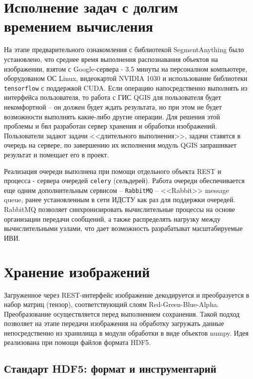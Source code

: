 \documentclass[732,14pt,final]{studrep}
\begin{document}
\section{Исполнение задач с долгим времением вычисления}

На этапе предварительного ознакомления с библиотекой SegmentAnything было установлено, что среднее время выполнения распознавания объектов на изображении, взятом с Google-сервера - 3.5 минуты на персоналном компьютере, оборудованом ОС Linux, видеокартой NVIDIA 1030 и использование библиотеки \verb|tensorflow| с поддержкой CUDA. Если операцию напосредственно выполнять из интерфейса пользователя, то работа с ГИС QGIS для пользователя будет некомфортной -- он должен будет ждать результата, но при этом не будет возможности выполнять какие-либо другие операции. Для решения этой проблемы и бвл разработан сервер хранения и обработки изображений. Пользователи задают задачи <<длительного выполнения>>, задачи ставятся в очередь на сервере, по завершению их исполнения модуль QGIS запрашивает результат и помещает его в проект.

Реализация очереди выполнена при помощи отдельного объекта REST и процесса - сервера очередей \verb|celery| (сельдерей). Работа очереди обеспечивается еще одним дополнительным сервисом -- \verb|RabbitMQ| -- <<Rabbit>> message queue, ранее установленным в сети ИДСТУ как раз для поддержки очередей. RabbitMQ позволяет синхронизировать вычислительные процессы на основе организации передачи сообщений, а также распределять нагрузку между вычислительными узлами, что дает возможность разрабатыват масштабируемые ИВИ. 

\section{Хранение изображений}

Загруженное через REST-интерфейс изображение декодируется и преобразуется в набор матриц (тензор), соответствующий слоям Red-Green-Blue-Alpha. Преобразование осуществляется перед выполнением сохранения. Такой подход позволяет на этапе передачи изображения на обработку загружать данные непосредственно из хранилища в модули обработки в виде объектов numpy. Идея реализована при помощи файлов формата HDF5.

\subsection{Стандарт HDF5: формат и инструментарий}
\end{document}
